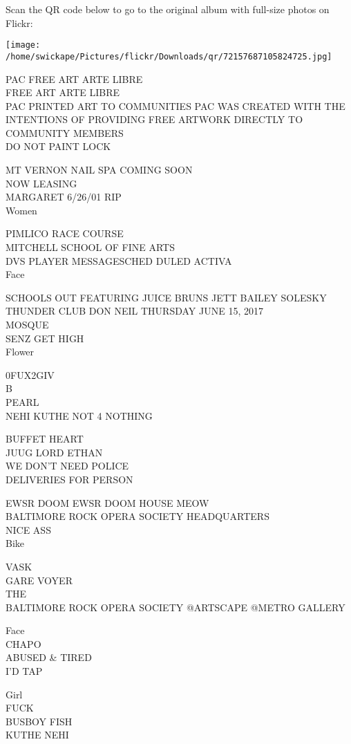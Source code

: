 \documentclass[10pt,letterpaper]{article}
\begin{document}
Scan the QR code below to go to the original album with full-size photos on Flickr:

\texttt{[image: /home/swickape/Pictures/flickr/Downloads/qr/72157687105824725.jpg]}


PAC FREE ART ARTE LIBRE\\
FREE ART ARTE LIBRE\\
PAC PRINTED ART TO COMMUNITIES PAC WAS CREATED WITH THE INTENTIONS OF PROVIDING FREE ARTWORK DIRECTLY TO COMMUNITY MEMBERS\\
DO NOT PAINT LOCK

MT VERNON NAIL SPA COMING SOON\\
NOW LEASING\\
MARGARET 6/26/01 RIP\\
Women

PIMLICO RACE COURSE\\
MITCHELL SCHOOL OF FINE ARTS\\
DVS PLAYER MESSAGESCHED DULED ACTIVA\\
Face

SCHOOLS OUT FEATURING JUICE BRUNS JETT BAILEY SOLESKY THUNDER CLUB DON NEIL THURSDAY JUNE 15, 2017\\
MOSQUE\\
SENZ GET HIGH\\
Flower

0FUX2GIV\\
B\\
PEARL\\
NEHI KUTHE NOT 4 NOTHING

BUFFET HEART\\
JUUG LORD ETHAN\\
WE DON'T NEED POLICE\\
DELIVERIES FOR PERSON

EWSR DOOM EWSR DOOM HOUSE MEOW\\
BALTIMORE ROCK OPERA SOCIETY HEADQUARTERS\\
NICE ASS\\
Bike

VASK\\
GARE VOYER\\
THE\\
BALTIMORE ROCK OPERA SOCIETY @ARTSCAPE @METRO GALLERY

Face\\
CHAPO\\
ABUSED \& TIRED\\
I'D TAP

Girl\\
FUCK\\
BUSBOY FISH\\
KUTHE NEHI
\end{document}
